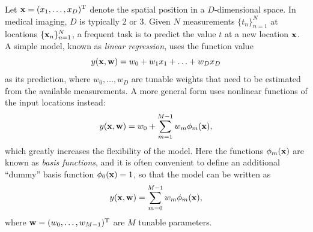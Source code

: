 \documentclass[10pt,twoside]{book}
\begin{document}
Let $\mathbf{x} = (x_1, \ldots, x_D )^\mathrm{T}$ denote the spatial position in a $D$-dimensional space. In medical imaging, $D$ is typically 2 or 3. 
%
Given $N$ measurements $\{t_n\}_{n=1}^N$ at locations $\{\mathbf{x}_n\}_{n=1}^N$, a frequent task is to predict the value $t$ at a new location $\mathbf{x}$.
%
A simple model, known as \emph{linear regression}, uses the function value
$$
y( \mathbf{x}, \mathbf{w} ) = w_0 + w_1 x_1 + \ldots + w_D x_D
$$
as its prediction, where 
$w_0, \ldots, w_D$
are tunable weights that need to be estimated from the 
available measurements.
%
A more general form uses nonlinear functions of the input locations instead:
$$
y( \mathbf{x}, \mathbf{w} ) = w_0 + \sum_{m=1}^{M-1} w_m \phi_m( \mathbf{x} )
,
$$
which greatly increases the flexibility of the model.
Here the functions $\phi_m(\mathbf{x})$ are known as \emph{basis functions}, and it is often convenient to define an additional ``dummy'' basis function 
$\phi_0(\mathbf{x})=1$, so that the model can be written as
\begin{equation}
y( \mathbf{x}, \mathbf{w} ) = \sum_{m=0}^{M-1} w_m \phi_m( \mathbf{x} ),
\label{eq:prediction}
\end{equation}
where $\mathbf{w} = (w_0, \ldots, w_{M-1})^\mathrm{T}$ are $M$ tunable parameters.
\end{document}
